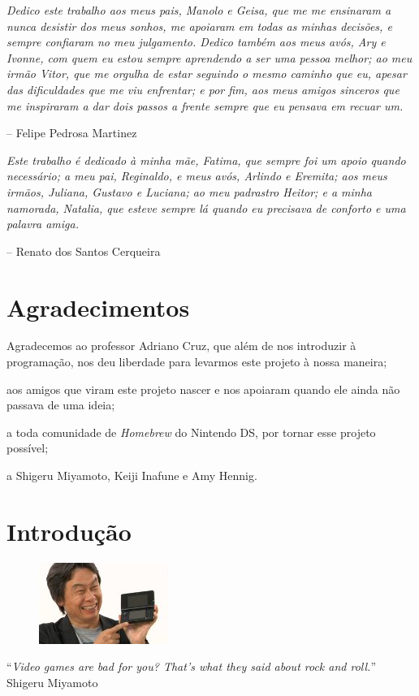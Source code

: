 \documentclass[brazil]{abnt}
\begin{document}
\textit{Dedico este trabalho aos meus pais, Manolo e Geisa, que me me ensinaram a nunca desistir dos meus sonhos, me apoiaram em todas as minhas decisões, e sempre confiaram no meu julgamento. Dedico também aos meus avós, Ary e Ivonne, com quem eu estou sempre aprendendo a ser uma pessoa melhor; ao meu irmão Vitor, que me orgulha de estar seguindo o mesmo caminho que eu, apesar das dificuldades que me viu enfrentar; e por fim, aos meus amigos sinceros que me inspiraram a dar dois passos a frente sempre que eu pensava em recuar um.}

\hfill -- Felipe Pedrosa Martinez

\vspace{30mm}

\textit{Este trabalho é dedicado à minha mãe, Fatima, que sempre foi um apoio quando necessário; a meu pai, Reginaldo, e meus avós, Arlindo e Eremita; aos meus irmãos, Juliana, Gustavo e Luciana; ao meu padrastro Heitor; e a minha namorada, Natalia, que esteve sempre lá quando eu precisava de conforto e uma palavra amiga.}

\hfill -- Renato dos Santos Cerqueira

\chapter*{Agradecimentos}

Agradecemos ao professor Adriano Cruz, que além de nos introduzir à programação, nos deu liberdade para levarmos este projeto à nossa maneira;

aos amigos que viram este projeto nascer e nos apoiaram quando ele ainda não passava de uma ideia;

a toda comunidade de \textit{Homebrew} do Nintendo DS, por tornar esse projeto possível;

a Shigeru Miyamoto, Keiji Inafune e Amy Hennig.

\tableofcontents{}
\listoffigures

\chapter{Introdução\label{cap:introducao}}

\vfill{}
\begin{flushright}{}
\begin{figure}[h!]
\hfill\includegraphics{imgs/shigeru.jpg}
\end{figure}
``\emph{Video games are bad for you? That's what they said about rock and roll.}''\\
{\small Shigeru Miyamoto}\end{flushright}{\small \par}
\vfill{}
\end{document}
